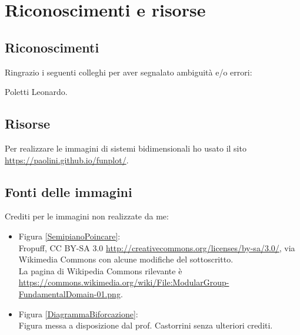 \chapter{Riconoscimenti e risorse}
\section*{Riconoscimenti}
Ringrazio i seguenti colleghi per aver segnalato ambiguit\`a e/o errori:
\begin{center}
Poletti Leonardo.
\end{center}
\section*{Risorse}
Per realizzare le immagini di sistemi bidimensionali ho usato il sito \url{https://paolini.github.io/funplot/}.
\section*{Fonti delle immagini}
Crediti per le immagini non realizzate da me:
\begin{itemize}
\item Figura \ref{SemipianoPoincare}:\\
Fropuff, CC BY-SA 3.0 \url{http://creativecommons.org/licenses/by-sa/3.0/}, via Wikimedia Commons con alcune modifiche del sottoscritto.\\
La pagina di Wikipedia Commons rilevante \`e \url{https://commons.wikimedia.org/wiki/File:ModularGroup-FundamentalDomain-01.png}.
\item Figura \ref{DiagrammaBiforcazione}:\\
Figura messa a disposizione dal prof. Castorrini senza ulteriori crediti.
\end{itemize}
